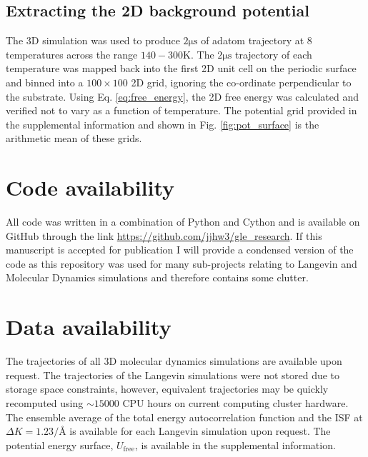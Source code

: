 \documentclass[7pt]{article}
\newcommand{\us}{\si{\micro\second}}
\newcommand{\K}{\si{\kelvin}}
\begin{document}
\subsection*{Extracting the 2D background potential}

The 3D simulation was used to produce $2\us$ of adatom trajectory at 8 temperatures across the range $140-300\K$. The $2\us$ trajectory of each temperature was mapped back into the first 2D unit cell on the periodic surface and binned into a $100\times100$ 2D grid, ignoring the co-ordinate perpendicular to the substrate. Using Eq. \ref{eq:free_energy}, the 2D free energy was calculated and verified not to vary as a function of temperature. The potential grid provided in the supplemental information and shown in Fig. \ref{fig:pot_surface} is the arithmetic mean of these grids.

\section*{Code availability}

All code was written in a combination of Python and Cython and is available on GitHub through the link \url{https://github.com/jjhw3/gle_research}. If this manuscript is accepted for publication I will provide a condensed version of the code as this repository was used for many sub-projects relating to Langevin and Molecular Dynamics simulations and therefore contains some clutter. 

\section*{Data availability}

The trajectories of all 3D molecular dynamics simulations are available upon request. The trajectories of the Langevin simulations were not stored due to storage space constraints, however, equivalent trajectories may be quickly recomputed using $\sim15000$ CPU hours on current computing cluster hardware. The ensemble average of the total energy autocorrelation function and the ISF at $\Delta{K}=1.23\si{\per\angstrom}$ is available for each Langevin simulation upon request. The potential energy surface, $U_{\text{free}}$, is available in the supplemental information.



\end{document}
